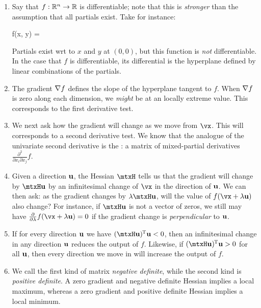 \documentclass[11pt, oneside]{amsart}
\begin{document}
\begin{enumerate}
  \item Say that $f:\mathbb{R}^n\to\mathbb{R}$ is differentiable; note that this is
  \emph{stronger} than the assumption that all partials exist. Take for
  instance:

  \begin{nedqn}
    f(x, y) = 
  \end{nedqn}

  Partials exist wrt to $x$ and $y$ at $(0, 0)$, but this function is
  \emph{not} differentiable. In the case that $f$ is differentiable, its
  differential is the hyperplane defined by linear combinations of the
  partials.

  \item The gradient $\nabla f$ defines the slope of the hyperplane
  tangent to $f$. When $\nabla f$ is zero along each dimension, we
  \emph{might} be at an locally extreme value. This corresponds to the
  first derivative test.

  \item We next ask how the gradient will change as we move from $\vx$.
  This will corresponds to a second derivative test. We know that the
  analogue of the univariate second derivative is the :
  a matrix of mixed-partial derivatives $\frac{\partial^2}{\partial x_i
  \partial x_j} f$.

  \item Given a direction $\bm{\mathrm{u}}$, the Hessian $\mtxH$ tells us that the
  gradient will change by $\mtxH \vu$ by an infinitesimal change of
  $\vx$ in the direction of $\bm{\mathrm{u}}$. We can then ask: as the gradient
  changes by $\lambda \mtxH \vu$, will the value of $f(\vx + \lambda
  \vu)$ also change? For instance, if $\mtxH \vu$ is not a vector of
  zeros, we still may have $\fpartial{\lambda} f(\vx + \lambda \vu) = 0$
  if the gradient change is \emph{perpendicular} to $\bm{\mathrm{u}}$.

  \item If for every direction $\bm{\mathrm{u}}$ we have $\parens{\mtxH \vu}\tran
  \vu < 0$, then an infinitesimal change in any direction $\bm{\mathrm{u}}$ reduces
  the output of $f$. Likewise, if $\parens{\mtxH \vu}\tran \vu > 0$ for
  all $\bm{\mathrm{u}}$, then every direction we move in will increase the output of
  $f$.

  \item We call the first kind of matrix \emph{negative definite}, while
  the second kind is \emph{positive definite}. A zero gradient and
  negative definite Hessian implies a local maximum, whereas a zero
  gradient and positive definite Hessian implies a local minimum.


\end{enumerate}
\end{document}
